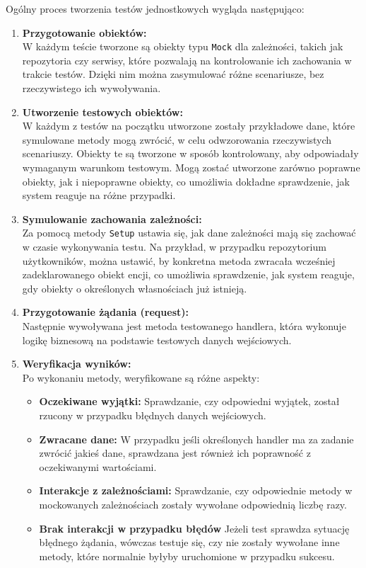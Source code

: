 \documentclass[twoside]{projektInzynierskiMS1}
\begin{document}
\newpage

\noindent
Ogólny proces tworzenia testów jednostkowych wygląda następująco:

\begin{enumerate}
    \item \textbf{Przygotowanie obiektów:}\\
    W każdym teście tworzone są obiekty typu \texttt{Mock} dla zależności, takich jak repozytoria czy serwisy, które pozwalają na kontrolowanie ich zachowania w trakcie testów. Dzięki nim można zasymulować różne scenariusze, bez rzeczywistego ich wywoływania.

    \item \textbf{Utworzenie testowych obiektów:}\\
    W każdym z testów na początku utworzone zostały przykładowe dane, które symulowane metody mogą zwrócić, w celu odwzorowania rzeczywistych scenariuszy. Obiekty te są tworzone w sposób kontrolowany, aby odpowiadały wymaganym warunkom testowym. Mogą zostać utworzone zarówno poprawne obiekty, jak i niepoprawne obiekty, co umożliwia dokładne sprawdzenie, jak system reaguje na różne przypadki.

    \item \textbf{Symulowanie zachowania zależności:}\\
    Za pomocą metody \texttt{Setup} ustawia się, jak dane zależności mają się zachować w czasie wykonywania testu. Na przykład, w przypadku repozytorium użytkowników, można ustawić, by konkretna metoda zwracała wcześniej zadeklarowanego obiekt encji, co umożliwia sprawdzenie, jak system reaguje, gdy obiekty o określonych własnościach już istnieją.

    \item \textbf{Przygotowanie żądania (request):}\\
    Następnie wywoływana jest metoda testowanego handlera, która wykonuje logikę biznesową na podstawie testowych danych wejściowych.

    \item \textbf{Weryfikacja wyników:} \\
    Po wykonaniu metody, weryfikowane są różne aspekty:

    \begin{itemize}
        \item \textbf{Oczekiwane wyjątki:} Sprawdzanie, czy odpowiedni wyjątek, został rzucony w przypadku błędnych danych wejściowych.
        \item \textbf{Zwracane dane:} W przypadku jeśli określonych handler ma za zadanie zwrócić jakieś dane, sprawdzana jest również ich poprawność z oczekiwanymi wartościami.
        \item \textbf{Interakcje z zależnościami:} Sprawdzanie, czy odpowiednie metody w mockowanych zależnościach zostały wywołane odpowiednią liczbę razy.
        \item \textbf{Brak interakcji w przypadku błędów} Jeżeli test sprawdza sytuację błędnego żądania, wówczas testuje się, czy nie zostały wywołane inne metody, które normalnie byłyby uruchomione w przypadku sukcesu.
    \end{itemize}

\end{enumerate}
\end{document}
